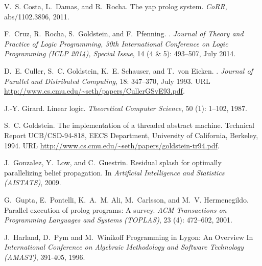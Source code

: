 \documentclass{sigplanconf}
\begin{document}
\begin{thebibliography}{35}
V.~S. Costa, L.~Damas, and R.~Rocha.
\newblock The yap prolog system.
\newblock \emph{CoRR}, abs/1102.3896, 2011.

F.~Cruz, R.~Rocha, S.~Goldstein, and F.~Pfenning.
.
\newblock \emph{Journal of Theory and Practice of Logic Programming, 30th
  International Conference on Logic Programming (ICLP 2014), Special Issue},
  14 (4 \& 5): 493--507, July 2014.

D.~E. Culler, S.~C. Goldstein, K.~E. Schauser, and T.~von Eicken.
.
\newblock \emph{Journal of Parallel and Distributed Computing}, 18:
  347--370, July 1993.
\newblock URL \url{http://www.cs.cmu.edu/~seth/papers/CullerGSvE93.pdf}.

J.-Y. Girard.
\newblock Linear logic.
\newblock \emph{Theoretical Computer Science}, 50 (1):
  1--102, 1987.

S.~C. Goldstein.
\newblock The implementation of a threaded abstract machine.
\newblock Technical Report UCB/CSD-94-818, EECS Department, University of
  California, Berkeley, 1994.
\newblock URL \url{http://www.cs.cmu.edu/~seth/papers/goldstein-tr94.pdf}.

J.~Gonzalez, Y.~Low, and C.~Guestrin.
\newblock Residual splash for optimally parallelizing belief propagation.
\newblock In \emph{Artificial Intelligence and Statistics (AISTATS)}, 2009.

G.~Gupta, E.~Pontelli, K.~A.~M. Ali, M.~Carlsson, and M.~V. Hermenegildo.
\newblock Parallel execution of prolog programs: {A} survey.
\newblock \emph{ACM Transactions on Programming Languages and Systems
  (TOPLAS)}, 23 (4): 472--602, 2001.

J.~Harland, D.~Pym and M.~Winikoff
\newblock Programming in Lygon: An Overview
\newblock In \emph{International Conference on Algebraic Methodology and Software Technology (AMAST)}, 391-405,  1996.


\end{thebibliography}
\end{document}
